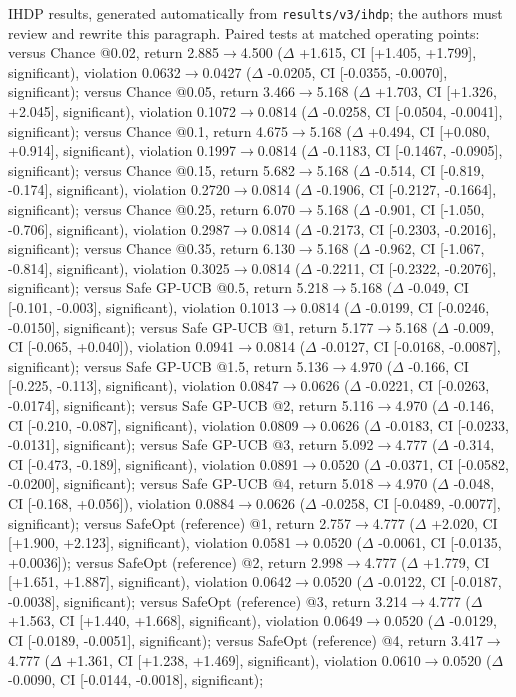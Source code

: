 IHDP results, generated automatically from \texttt{results/v3/ihdp}; the authors must review and rewrite this paragraph. Paired tests at matched operating points:
versus Chance @0.02, return 2.885$\to$4.500 ($\Delta$ +1.615, CI [+1.405, +1.799], significant), violation 0.0632$\to$0.0427 ($\Delta$ -0.0205, CI [-0.0355, -0.0070], significant);
versus Chance @0.05, return 3.466$\to$5.168 ($\Delta$ +1.703, CI [+1.326, +2.045], significant), violation 0.1072$\to$0.0814 ($\Delta$ -0.0258, CI [-0.0504, -0.0041], significant);
versus Chance @0.1, return 4.675$\to$5.168 ($\Delta$ +0.494, CI [+0.080, +0.914], significant), violation 0.1997$\to$0.0814 ($\Delta$ -0.1183, CI [-0.1467, -0.0905], significant);
versus Chance @0.15, return 5.682$\to$5.168 ($\Delta$ -0.514, CI [-0.819, -0.174], significant), violation 0.2720$\to$0.0814 ($\Delta$ -0.1906, CI [-0.2127, -0.1664], significant);
versus Chance @0.25, return 6.070$\to$5.168 ($\Delta$ -0.901, CI [-1.050, -0.706], significant), violation 0.2987$\to$0.0814 ($\Delta$ -0.2173, CI [-0.2303, -0.2016], significant);
versus Chance @0.35, return 6.130$\to$5.168 ($\Delta$ -0.962, CI [-1.067, -0.814], significant), violation 0.3025$\to$0.0814 ($\Delta$ -0.2211, CI [-0.2322, -0.2076], significant);
versus Safe GP-UCB @0.5, return 5.218$\to$5.168 ($\Delta$ -0.049, CI [-0.101, -0.003], significant), violation 0.1013$\to$0.0814 ($\Delta$ -0.0199, CI [-0.0246, -0.0150], significant);
versus Safe GP-UCB @1, return 5.177$\to$5.168 ($\Delta$ -0.009, CI [-0.065, +0.040]), violation 0.0941$\to$0.0814 ($\Delta$ -0.0127, CI [-0.0168, -0.0087], significant);
versus Safe GP-UCB @1.5, return 5.136$\to$4.970 ($\Delta$ -0.166, CI [-0.225, -0.113], significant), violation 0.0847$\to$0.0626 ($\Delta$ -0.0221, CI [-0.0263, -0.0174], significant);
versus Safe GP-UCB @2, return 5.116$\to$4.970 ($\Delta$ -0.146, CI [-0.210, -0.087], significant), violation 0.0809$\to$0.0626 ($\Delta$ -0.0183, CI [-0.0233, -0.0131], significant);
versus Safe GP-UCB @3, return 5.092$\to$4.777 ($\Delta$ -0.314, CI [-0.473, -0.189], significant), violation 0.0891$\to$0.0520 ($\Delta$ -0.0371, CI [-0.0582, -0.0200], significant);
versus Safe GP-UCB @4, return 5.018$\to$4.970 ($\Delta$ -0.048, CI [-0.168, +0.056]), violation 0.0884$\to$0.0626 ($\Delta$ -0.0258, CI [-0.0489, -0.0077], significant);
versus SafeOpt (reference) @1, return 2.757$\to$4.777 ($\Delta$ +2.020, CI [+1.900, +2.123], significant), violation 0.0581$\to$0.0520 ($\Delta$ -0.0061, CI [-0.0135, +0.0036]);
versus SafeOpt (reference) @2, return 2.998$\to$4.777 ($\Delta$ +1.779, CI [+1.651, +1.887], significant), violation 0.0642$\to$0.0520 ($\Delta$ -0.0122, CI [-0.0187, -0.0038], significant);
versus SafeOpt (reference) @3, return 3.214$\to$4.777 ($\Delta$ +1.563, CI [+1.440, +1.668], significant), violation 0.0649$\to$0.0520 ($\Delta$ -0.0129, CI [-0.0189, -0.0051], significant);
versus SafeOpt (reference) @4, return 3.417$\to$4.777 ($\Delta$ +1.361, CI [+1.238, +1.469], significant), violation 0.0610$\to$0.0520 ($\Delta$ -0.0090, CI [-0.0144, -0.0018], significant);
